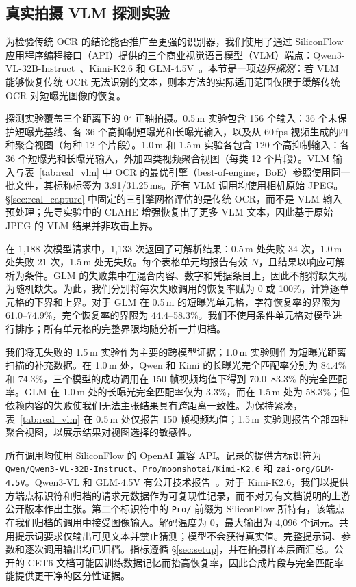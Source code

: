 \subsection{真实拍摄 VLM 探测实验}
\label{sec:vlm}

为检验传统 OCR 的结论能否推广至更强的识别器，我们使用了通过 SiliconFlow 应用程序编程接口（API）提供的三个商业视觉语言模型（VLM）端点：Qwen3-VL-32B-Instruct~\cite{b_qwen3vl2025}、Kimi-K2.6 和 GLM-4.5V~\cite{b_glm45v2025}。本节是一项\emph{边界探测}：若 VLM 能够恢复传统 OCR 无法识别的文本，则本方法的实际适用范围仅限于缓解传统 OCR 对短曝光图像的恢复。

探测实验覆盖三个距离下的 0$^{\circ}$ 正轴拍摄。0.5\,m 实验包含 156 个输入：36 个未保护短曝光基线、各 36 个高抑制短曝光和长曝光输入，以及从 60\,fps 视频生成的四种聚合视图（每种 12 个片段）。1.0\,m 和 1.5\,m 实验各包含 120 个高抑制输入：各 36 个短曝光和长曝光输入，外加四类视频聚合视图（每类 12 个片段）。VLM 输入与表~\ref{tab:real_vlm} 中 OCR 的最优引擎（best-of-engine，BoE）参照使用同一批文件，其标称标签为 3.91/31.25\,ms。所有 VLM 调用均使用相机原始 JPEG。\S\ref{sec:real_capture} 中固定的三引擎网格评估的是传统 OCR，而不是 VLM 输入预处理；先导实验中的 CLAHE 增强恢复出了更多 VLM 文本，因此基于原始 JPEG 的 VLM 结果并非攻击上界。

在 1,188 次模型请求中，1,133 次返回了可解析结果：0.5\,m 处失败 34 次，1.0\,m 处失败 21 次，1.5\,m 处无失败。每个表格单元均报告有效 $N$，且结果以响应可解析为条件。GLM 的失败集中在混合内容、数字和凭据条目上，因此不能将缺失视为随机缺失。为此，我们分别将每次失败调用的恢复率赋为 0 或 100\%，计算逐单元格的下界和上界。对于 GLM 在 0.5\,m 的短曝光单元格，字符恢复率的界限为 61.0--74.9\%，完全恢复率的界限为 44.4--58.3\%。我们不使用条件单元格对模型进行排序；所有单元格的完整界限均随分析一并归档。

我们将无失败的 1.5\,m 实验作为主要的跨模型证据；1.0\,m 实验则作为短曝光距离扫描的补充数据。在 1.0\,m 处，Qwen 和 Kimi 的长曝光完全匹配率分别为 84.4\% 和 74.3\%，三个模型的成功调用在 150 帧视频均值下得到 70.0--83.3\% 的完全匹配率。GLM 在 1.0\,m 处的长曝光完全匹配率仅为 3.3\%，而在 1.5\,m 处为 58.3\%；但依赖内容的失败使我们无法主张结果具有跨距离一致性。为保持紧凑，表~\ref{tab:real_vlm} 在 0.5\,m 处仅报告 150 帧视频均值；1.5\,m 实验则报告全部四种聚合视图，以展示结果对视图选择的敏感性。

所有调用均使用 SiliconFlow 的 OpenAI 兼容 API。记录的提供方标识符为 \texttt{Qwen/\allowbreak Qwen3-\allowbreak VL-\allowbreak 32B-\allowbreak Instruct}、\texttt{Pro/\allowbreak moonshotai/\allowbreak Kimi-\allowbreak K2.6} 和 \texttt{zai-\allowbreak org/\allowbreak GLM-\allowbreak 4.5V}。Qwen3-VL 和 GLM-4.5V 有公开技术报告~\cite{b_qwen3vl2025,b_glm45v2025}。对于 Kimi-K2.6，我们以提供方端点标识符和归档的请求元数据作为可复现性记录，而不对另有文档说明的上游公开版本作出主张。第二个标识符中的 \texttt{Pro/} 前缀为 SiliconFlow 所特有，该端点在我们归档的调用中接受图像输入。解码温度为 0，最大输出为 4,096 个词元。共用提示词要求仅输出可见文本并禁止猜测；模型不会获得真实值。完整提示词、参数和逐次调用输出均已归档。指标遵循 \S\ref{sec:setup}，并在拍摄样本层面汇总。公开的 CET6 文档可能因训练数据记忆而抬高恢复率，因此合成片段与完全匹配率能提供更干净的区分性证据。

